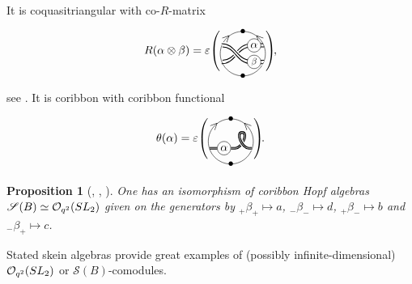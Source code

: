 \documentclass[11pt]{article}
\numberwithin{equation}{section}
\numberwithin{equation}{section}
\newtheorem{Proposition}[Theorem]{Proposition}
 { \theoremstyle{definition}
\newtheorem{Definition}[Theorem]{Definition}
\newtheorem{Note}[Theorem]{Note}
\newtheorem{Example}[Theorem]{Example}
\newtheorem{Remark}[Theorem]{Remark} }
\newcommand{\Oq}{\mathcal{O}_{q^2}({\rm SL}_2)}
\begin{document}
\begin{Example}
\[ \]
It is coquasitriangular with co-$R$-matrix
\[
R(\alpha \otimes \beta) =\varepsilon
\raisebox{0pt}{$\left(\rule{-3pt}{22pt}\right.$}\!
\begin{tikzpicture}[scale = 0.7, baseline = 0pt, rotate = 180]
\draw (0,-1) node{\small $\bullet$} arc(-90:90:1) node[near start, sloped]{\small $>$} node{\small $\bullet$};
\draw (0,-1) arc(-90:-270:1) node[near start, sloped]{\small $<$};
\draw[thick] (-0.9,-0.45) -- (-0.4,-0.45) .. controls (0.3,-0.45) and (0.3,0.3).. (0.9,0.3);
\draw[thick] (-0.94,-0.3) -- (-0.4,-0.3) .. controls (0.3,-0.3) and (0.3,0.45).. (0.94,0.45);
\draw[line width = 3pt, white] (-0.94,0.3) -- (-0.4,0.3) .. controls (0.3,0.3) and (0.3,-0.45).. (0.94,-0.45);
\draw[thick] (-0.94,0.3) -- (-0.4,0.3) .. controls (0.3,0.3) and (0.3,-0.45).. (0.94,-0.45);
\draw[line width = 3pt, white] (-0.9,0.45) -- (-0.4,0.45) .. controls (0.3,0.45) and (0.3,-0.3).. (0.9,-0.3);
\draw[thick] (-0.9,0.45) -- (-0.4,0.45) .. controls (0.3,0.45) and (0.3,-0.3).. (0.9,-0.3);
\node[circle, fill=white, draw = black, scale = 0.8, inner sep = 1.5pt] (X) at (-0.5,0.37){$\beta$};
\node[circle, fill=white, draw = black, scale = 1, inner sep = 1.5pt] (X) at (-0.5,-0.37){$\alpha$};
\end{tikzpicture}\!
\raisebox{0pt}{$\left.\rule{-3pt}{22pt}\right)$}\!,
\]
see \cite[Theorem~3.5]{Cos}.
It is coribbon with coribbon functional
\[
\theta(\alpha) = \varepsilon
\raisebox{0pt}{$\left(\rule{-3pt}{22pt}\right.$}\!
\begin{tikzpicture}[scale = 0.7, baseline = 0pt]
\draw (0,-1) node{\small $\bullet$} arc(-90:90:1) node[near end, sloped]{\small $<$} node{\small $\bullet$};
\draw (0,-1) arc(-90:-270:1) node[near end, sloped]{\small $>$};
\node[circle, draw = black, scale = 1, inner sep = 1.5pt] (X) at (-0.3,-0.3){$\alpha$};
\draw[thick, double] (-0.94,-0.3) -- (X) -- (0.2,-0.3) .. controls (0.5,-0.3) and (0.8,0.4).. (0.5,0.4);
\draw[line width = 4pt, white] (0.5,0.4).. controls (0.2,0.4) and (0.5,-0.3) .. (0.8,-0.3) -- (0.94,-0.3);
\draw[thick, double] (0.5,0.4).. controls (0.2,0.4) and (0.5,-0.3) .. (0.8,-0.3) -- (0.94,-0.3);
\end{tikzpicture}\!
\raisebox{0pt}{$\left.\rule{-3pt}{22pt}\right)$}\!.
\]
\end{Example}

\begin{Proposition}[{\cite[Theorem~4.1]{TTQLe}, \cite[Section~2.2]{KorQue}}, {\cite[Theorem~3.4]{Cos}}]
One has an isomorphism of coribbon Hopf algebras $\mathscr{S}(B)\simeq \Oq$ given on the generators by $_+\beta_+\mapsto a$, ${}_-\beta_{-}\mapsto d$,  ${}_+\beta_{-}\mapsto b$ and ${}_-\beta_{+}\mapsto c$.
\end{Proposition}
Stated skein algebras provide great examples of (possibly infinite-dimensional) $\Oq$ or $\mathscr{S}(B)$-comodules.
\end{document}
